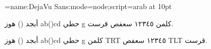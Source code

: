 


\font\test={name:DejaVu Sans:mode=node;script=arab} at 10pt

\test
أبجد () هوز ab()cd حطي g كلمن ١٢٣٤٥ سعفص قرست.

أبجد () هوز ab()cd حطي g كلمن {\textdir TRT ١٢٣٤٥} سعفص {\textdir TLT قرست}.
\bye
